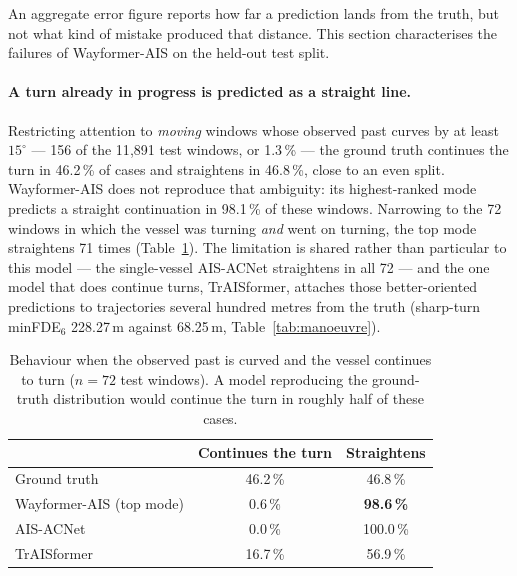 \documentclass[12pt, a4paper]{article}
\begin{document}
  An aggregate error figure reports how far a prediction lands from the truth,
  but not what kind of mistake produced that distance.  This section
  characterises the failures of Wayformer-AIS on the held-out test split.

  \paragraph{A turn already in progress is predicted as a straight line.}
  Restricting attention to \emph{moving} windows whose observed past curves by at
  least $15^{\circ}$ --- 156 of the 11{,}891 test windows, or 1.3\,\% --- the ground
  truth continues the turn in 46.2\,\% of cases and straightens in 46.8\,\%,
  close to an even split.  Wayformer-AIS does not reproduce that ambiguity: its
  highest-ranked mode predicts a straight continuation in 98.1\,\% of these
  windows.  Narrowing to the 72 windows in which the vessel was turning
  \emph{and} went on turning, the top mode straightens 71 times
  (Table~\ref{tab:turn_continuation}).  The limitation is shared rather than
  particular to this model --- the single-vessel AIS-ACNet straightens in all 72 ---
  and the one model that does continue turns, TrAISformer, attaches those
  better-oriented predictions to trajectories several hundred metres from the
  truth (sharp-turn minFDE$_6$ 228.27\,m against 68.25\,m, Table~\ref{tab:manoeuvre}).

  \begin{table}[H]
    \centering
    \small
    \caption{Behaviour when the observed past is curved and the vessel continues
             to turn ($n = 72$ test windows).  A model reproducing the
             ground-truth distribution would continue the turn in roughly half
             of these cases.}
    \label{tab:turn_continuation}
    \begin{tabular}{lcc}
      \toprule
      & \textbf{Continues the turn} & \textbf{Straightens} \\
      \midrule
      Ground truth                 & 46.2\,\% & 46.8\,\% \\
      \midrule
      Wayformer-AIS (top mode)     & 0.6\,\%  & \textbf{98.6\,\%} \\
      AIS-ACNet                    & 0.0\,\%  & 100.0\,\% \\
      TrAISformer                  & 16.7\,\% & 56.9\,\% \\
      \bottomrule
    \end{tabular}
  \end{table}
\end{document}
